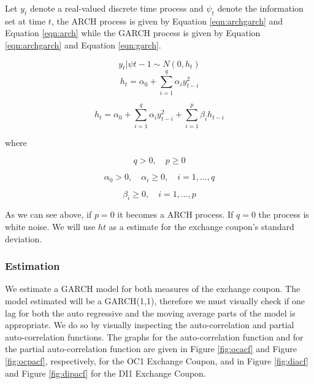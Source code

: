 \documentclass[a4paper]{article}
\begin{document}
Let $y_t$ denote a real-valued discrete time process and $\psi_t$ denote the information set at time $t$, the ARCH process is given by Equation \ref{eqn:archgarch} and Equation \ref{eqn:arch} while the GARCH process is given by Equation \ref{eqn:archgarch} and Equation \ref{eqn:garch}.

\begin{equation}
\label{eqn:archgarch}
y_t | \psi{t-1} \sim N(0,h_t)
\end{equation}
\begin{equation}
\label{eqn:arch}
h_t = \alpha_0 + \displaystyle\sum_{i=1}^{q} \alpha_i y_{t-i}^2
\end{equation}

\begin{equation}
\label{eqn:garch}
h_t = \alpha_0 + \displaystyle\sum_{i=1}^{q} \alpha_i y_{t-i}^2 + \displaystyle\sum_{i=1}^{p} \beta_i h_{t-i}
\end{equation}

where

$$q > 0, \quad   p \geq 0$$

$$\alpha_0 > 0, \quad  \alpha_i \geq 0, \quad  i=1,...,q$$

$$\beta_i \geq 0, \quad  i=1,...,p$$

As we can see above, if $p = 0$ it becomes a ARCH process. If $q = 0$ the process is white noise. We will use $ht$ as a estimate for the exchange coupon's standard deviation.







\subsubsection{Estimation}

We estimate a GARCH model for both measures of the exchange coupon. The model estimated will be a GARCH(1,1), therefore we must visually check if one lag for both the auto regressive and the moving average parts of the model is appropriate. We do so by visually inspecting the auto-correlation and partial auto-correlation functions. The graphs for the auto-correlation function and for the partial auto-correlation function are given in Figure \ref{fig:ocacf} and Figure \ref{fig:ocpacf}, respectively, for the OC1 Exchange Coupon, and in Figure \ref{fig:diacf} and Figure \ref{fig:dipacf} for the DI1 Exchange Coupon.


\end{document}

